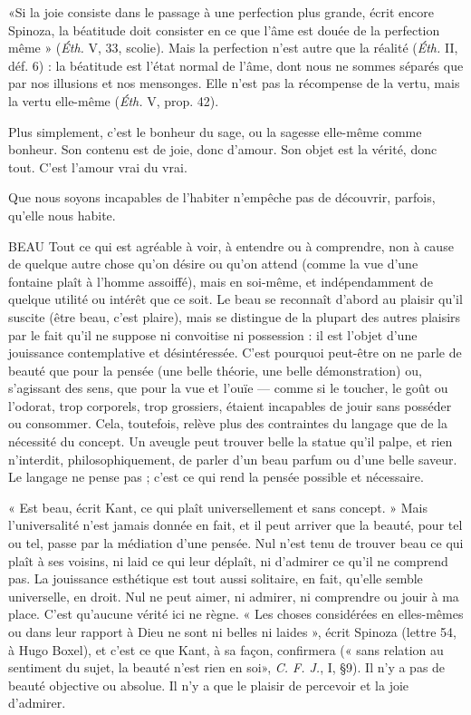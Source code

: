 «Si la joie consiste dans le passage à une perfection plus grande, écrit
encore Spinoza, la béatitude doit consister en ce que l’âme est douée de la perfection
même » ({\it Éth.} V, 33, scolie). Mais la perfection n’est autre que la réalité
({\it Éth.} II, déf. 6) : la béatitude est l’état normal de l’âme, dont nous ne sommes
séparés que par nos illusions et nos mensonges. Elle n’est pas la récompense de
la vertu, mais la vertu elle-même ({\it Éth.} V, prop. 42).

Plus simplement, c’est le bonheur du sage, ou la sagesse elle-même comme
bonheur. Son contenu est de joie, donc d’amour. Son objet est la vérité, donc
tout. C’est l’amour vrai du vrai.

Que nous soyons incapables de l’habiter n'empêche pas de découvrir, parfois,
qu’elle nous habite.

BEAU Tout ce qui est agréable à voir, à entendre ou à comprendre, non à
cause de quelque autre chose qu’on désire ou qu’on attend (comme la
vue d’une fontaine plaît à l’homme assoiffé), mais en soi-même, et indépendamment
de quelque utilité ou intérêt que ce soit. Le beau se reconnaît d’abord
au plaisir qu’il suscite (être beau, c’est plaire), mais se distingue de la plupart
des autres plaisirs par le fait qu’il ne suppose ni convoitise ni possession : il est
l’objet d’une jouissance contemplative et désintéressée. C’est pourquoi peut-être
on ne parle de beauté que pour la pensée (une belle théorie, une belle
démonstration) ou, s’agissant des sens, que pour la vue et l’ouïe — comme si le
toucher, le goût ou l’odorat, trop corporels, trop grossiers, étaient incapables de
jouir sans posséder ou consommer. Cela, toutefois, relève plus des contraintes
du langage que de la nécessité du concept. Un aveugle peut trouver belle la
statue qu’il palpe, et rien n’interdit, philosophiquement, de parler d’un beau
parfum ou d’une belle saveur. Le langage ne pense pas ; c’est ce qui rend la
pensée possible et nécessaire.

« Est beau, écrit Kant, ce qui plaît universellement et sans concept. » Mais
l'universalité n’est jamais donnée en fait, et il peut arriver que la beauté, pour
tel ou tel, passe par la médiation d’une pensée. Nul n’est tenu de trouver beau
ce qui plaît à ses voisins, ni laid ce qui leur déplaît, ni d'admirer ce qu’il ne
comprend pas. La jouissance esthétique est tout aussi solitaire, en fait, qu’elle
semble universelle, en droit. Nul ne peut aimer, ni admirer, ni comprendre ou
jouir à ma place. C’est qu'aucune vérité ici ne règne. « Les choses considérées
en elles-mêmes ou dans leur rapport à Dieu ne sont ni belles ni laides », écrit
Spinoza (lettre 54, à Hugo Boxel), et c’est ce que Kant, à sa façon, confirmera
(« sans relation au sentiment du sujet, la beauté n’est rien en soi», {\it C. F. J.}, I,
\S 9). Il n’y a pas de beauté objective ou absolue. Il n’y a que le plaisir de percevoir
et la joie d'admirer.

